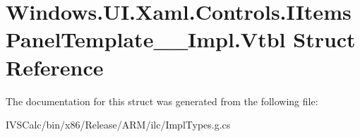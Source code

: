 \hypertarget{struct_windows_1_1_u_i_1_1_xaml_1_1_controls_1_1_i_items_panel_template_____impl_1_1_vtbl}{}\section{Windows.\+U\+I.\+Xaml.\+Controls.\+I\+Items\+Panel\+Template\+\_\+\+\_\+\+Impl.\+Vtbl Struct Reference}
\label{struct_windows_1_1_u_i_1_1_xaml_1_1_controls_1_1_i_items_panel_template_____impl_1_1_vtbl}


The documentation for this struct was generated from the following file\+:\begin{DoxyCompactItemize}
\item 
I\+V\+S\+Calc/bin/x86/\+Release/\+A\+R\+M/ilc/Impl\+Types.\+g.\+cs\end{DoxyCompactItemize}
